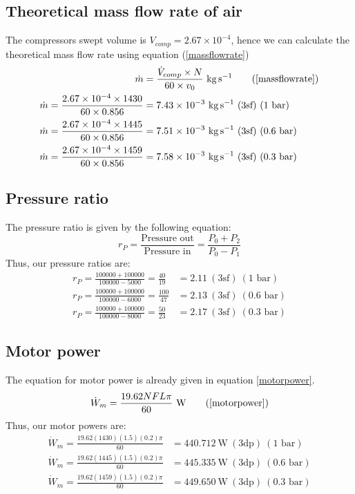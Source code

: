 \documentclass[class=article, crop=false, 12pt,a4paper]{standalone}
\numberwithin{equation}{section}
\begin{document}
\subsection{Theoretical mass flow rate of air}
The compressors swept volume is \(V_{comp} = 2.67 \times 10^{-4}\), hence we can calculate the theoretical mass flow rate using equation (\ref{massflowrate})
\begin{align}
  \dot{m} &= \frac{\dot{V}_{comp} \times N}{60 \times v_0} \ \si{\kg\per\second} \tag{\ref{massflowrate}}\\
  \dot{m} = \frac{2.67 \times 10^{-4} \times 1430}{60 \times 0.856} &= 7.43 \times 10^{-3} \ \si{\kg\per\second} \ (3\textrm{sf}) \textrm{ (1 bar)}\\
  \dot{m} = \frac{2.67 \times 10^{-4} \times 1445}{60 \times 0.856} &= 7.51 \times 10^{-3} \ \si{\kg\per\second} \ (3\textrm{sf}) \textrm{ (0.6 bar)}\\
  \dot{m} = \frac{2.67 \times 10^{-4} \times 1459}{60 \times 0.856} &= 7.58 \times 10^{-3} \ \si{\kg\per\second} \ (3\textrm{sf}) \textrm{ (0.3 bar)}
\end{align}
\subsection{Pressure ratio}
The pressure ratio is given by the following equation:
\begin{equation}
  r_P = \frac{\textrm{Pressure out}}{\textrm{Pressure in}} = \frac{P_0 + P_2}{P_0-P_1}
\end{equation}
Thus, our pressure ratios are:
\begin{align}
  r_P = \frac{100000 + 100000}{100000-5000} = \frac{40}{19} &= 2.11 \ (3\textrm{sf}) \ (1 \textrm{ bar})\\
  r_P = \frac{100000 + 100000}{100000-6000} = \frac{100}{47} &= 2.13 \ (3\textrm{sf}) \ (0.6 \textrm{ bar})\\
  r_P = \frac{100000 + 100000}{100000-8000} = \frac{50}{23} &= 2.17 \ (3\textrm{sf}) \ (0.3 \textrm{ bar})
\end{align}
\subsection{Motor power}
The equation for motor power is already given in equation \ref{motorpower}.
\begin{equation}
  \dot{W}_{m} = \frac{19.62NFL\pi}{60} \ \si{\watt}
  \tag{\ref{motorpower}}
\end{equation}
Thus, our motor powers are:
\begin{align}
  \dot{W}_{m} = \frac{19.62(1430)(1.5)(0.2)\pi}{60} &= 440.712\ \si{\watt} \ (3\textrm{dp}) \ (1 \textrm{ bar})\\
  \dot{W}_{m} = \frac{19.62(1445)(1.5)(0.2)\pi}{60} &= 445.335\ \si{\watt} \ (3\textrm{dp}) \ (0.6 \textrm{ bar})\\
  \dot{W}_{m} = \frac{19.62(1459)(1.5)(0.2)\pi}{60} &= 449.650\ \si{\watt} \ (3\textrm{dp}) \ (0.3 \textrm{ bar})
\end{align}
\end{document}
